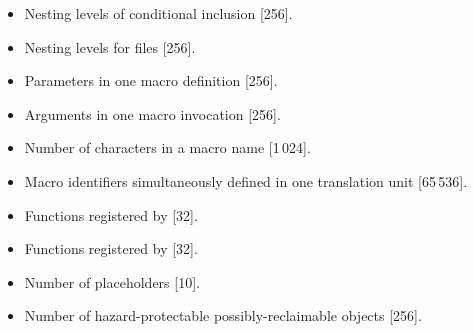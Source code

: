 \begin{itemize}
\item%
Nesting levels of conditional inclusion [256].
\item%
Nesting levels for
files [256].
\item%
Parameters in one macro definition [256].
\item%
Arguments in one macro invocation [256].
\item%
Number of characters in a macro name [1\,024].
\item%
Macro identifiers simultaneously defined in one
translation unit [65\,536].
\item%
Functions registered by
 [32].
\item%
Functions registered by
 [32].
\item%
Number of placeholders [10].
\item%
Number of hazard-protectable possibly-reclaimable objects [256].

\end{itemize}
